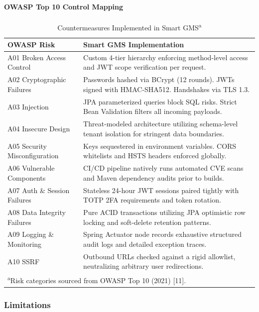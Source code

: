 \paragraph*{OWASP Top 10 Control
Mapping}\label{owasp-top-10-control-mapping}

\begin{table}[H]
\centering
\scriptsize
\renewcommand{\arraystretch}{1.1}
\caption{Countermeasures Implemented in Smart GMS\textsuperscript{a}}
\begin{tabular}{@{} p{2.5cm} p{5.4cm} @{}}
\toprule
\textbf{OWASP Risk} & \textbf{Smart GMS Implementation} \\
\midrule
A01 Broken Access Control &
  Custom 4-tier hierarchy enforcing method-level access and JWT scope verification per request. \\
A02 Cryptographic Failures &
  Passwords hashed via BCrypt (12 rounds). JWTs signed with HMAC-SHA512. Handshakes via TLS 1.3. \\
A03 Injection &
  JPA parameterized queries block SQL risks. Strict Bean Validation filters all incoming payloads. \\
A04 Insecure Design &
  Threat-modeled architecture utilizing schema-level tenant isolation for stringent data boundaries. \\
A05 Security Misconfiguration &
  Keys sequestered in environment variables. CORS whitelists and HSTS headers enforced globally. \\
A06 Vulnerable Components &
  CI/CD pipeline natively runs automated CVE scans and Maven dependency audits prior to builds. \\
A07 Auth \& Session Failures &
  Stateless 24-hour JWT sessions paired tightly with TOTP 2FA requirements and token rotation. \\
A08 Data Integrity Failures &
  Pure ACID transactions utilizing JPA optimistic row locking and soft-delete retention patterns. \\
A09 Logging \& Monitoring &
  Spring Actuator node records exhaustive structured audit logs and detailed exception traces. \\
A10 SSRF &
  Outbound URLs checked against a rigid allowlist, neutralizing arbitrary user redirections. \\
\bottomrule
\multicolumn{2}{l}{\textsuperscript{a}\footnotesize{Risk categories sourced from OWASP Top 10 (2021) [11].}}
\end{tabular}
\end{table}

\subsubsection*{Limitations}\label{limitations}

